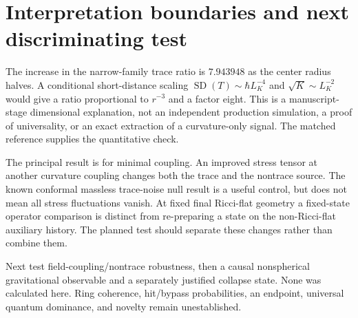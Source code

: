 \documentclass[10pt]{article}
\begin{document}
\section{Interpretation boundaries and next discriminating test}
The increase in the narrow-family trace ratio is $7.943948$ as the center radius halves. A conditional short-distance scaling $\operatorname{SD}(T)\sim\hbar L_K^{-4}$ and $\sqrt K\sim L_K^{-2}$ would give a ratio proportional to $r^{-3}$ and a factor eight. This is a manuscript-stage dimensional explanation, not an independent production simulation, a proof of universality, or an exact extraction of a curvature-only signal. The matched reference supplies the quantitative check.

The principal result is for minimal coupling. An improved stress tensor at another curvature coupling changes both the trace and the nontrace source. The known conformal massless trace-noise null result is a useful control, but does not mean all stress fluctuations vanish. At fixed final Ricci-flat geometry a fixed-state operator comparison is distinct from re-preparing a state on the non-Ricci-flat auxiliary history. The planned test should separate these changes rather than combine them.

\enlargethispage{3\baselineskip}
Next test field-coupling/nontrace robustness, then a causal nonspherical gravitational observable and a separately justified collapse state. None was calculated here. Ring coherence, hit/bypass probabilities, an endpoint, universal quantum dominance, and novelty remain unestablished.
\end{document}
